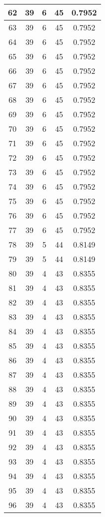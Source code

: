 \documentclass[letterpaper, 12pt]{article}
\begin{document}
\begin{longtable}{|c|c|c|c|c|}
\hline
62 & 39 & 6 & 45 & 0.7952 \\
\hline
63 & 39 & 6 & 45 & 0.7952 \\
\hline
64 & 39 & 6 & 45 & 0.7952 \\
\hline
65 & 39 & 6 & 45 & 0.7952 \\
\hline
66 & 39 & 6 & 45 & 0.7952 \\
\hline
67 & 39 & 6 & 45 & 0.7952 \\
\hline
68 & 39 & 6 & 45 & 0.7952 \\
\hline
69 & 39 & 6 & 45 & 0.7952 \\
\hline
70 & 39 & 6 & 45 & 0.7952 \\
\hline
71 & 39 & 6 & 45 & 0.7952 \\
\hline
72 & 39 & 6 & 45 & 0.7952 \\
\hline
73 & 39 & 6 & 45 & 0.7952 \\
\hline
74 & 39 & 6 & 45 & 0.7952 \\
\hline
75 & 39 & 6 & 45 & 0.7952 \\
\hline
76 & 39 & 6 & 45 & 0.7952 \\
\hline
77 & 39 & 6 & 45 & 0.7952 \\
\hline
78 & 39 & 5 & 44 & 0.8149 \\
\hline
79 & 39 & 5 & 44 & 0.8149 \\
\hline
80 & 39 & 4 & 43 & 0.8355 \\
\hline
81 & 39 & 4 & 43 & 0.8355 \\
\hline
82 & 39 & 4 & 43 & 0.8355 \\
\hline
83 & 39 & 4 & 43 & 0.8355 \\
\hline
84 & 39 & 4 & 43 & 0.8355 \\
\hline
85 & 39 & 4 & 43 & 0.8355 \\
\hline
86 & 39 & 4 & 43 & 0.8355 \\
\hline
87 & 39 & 4 & 43 & 0.8355 \\
\hline
88 & 39 & 4 & 43 & 0.8355 \\
\hline
89 & 39 & 4 & 43 & 0.8355 \\
\hline
90 & 39 & 4 & 43 & 0.8355 \\
\hline
91 & 39 & 4 & 43 & 0.8355 \\
\hline
92 & 39 & 4 & 43 & 0.8355 \\
\hline
93 & 39 & 4 & 43 & 0.8355 \\
\hline
94 & 39 & 4 & 43 & 0.8355 \\
\hline
95 & 39 & 4 & 43 & 0.8355 \\
\hline
96 & 39 & 4 & 43 & 0.8355 \\

\end{longtable}
\end{document}
